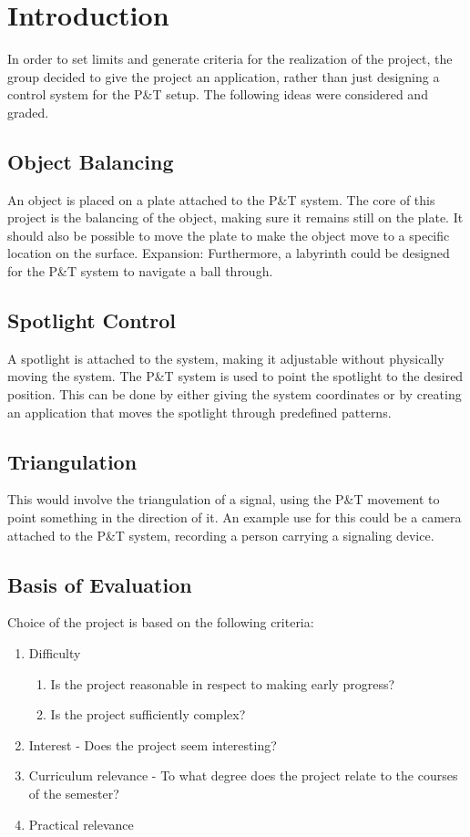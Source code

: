 \section{Introduction}

In order to set limits and generate criteria for the realization of the project, the group decided to give the project an application, rather than just designing a control system for the P\&T setup. The following ideas were considered and graded.

\subsection{Object Balancing}
An object is placed on a plate attached to the P\&T system. The core of this project is the balancing of the object, making sure it remains still on the plate. It should also be possible to move the plate to make the object move to a specific location on the surface.
Expansion: Furthermore, a labyrinth could be designed for the P\&T system to navigate a ball through.

\subsection{Spotlight Control}
A spotlight is attached to the system, making it adjustable without physically moving the system. The P\&T system is used to point the spotlight to the desired position. This can be done by either giving the system coordinates or by creating an application that moves the spotlight through predefined patterns.

\subsection{Triangulation}
This would involve the triangulation of a signal, using the P\&T movement to point something in the direction of it. An example use for this could be a camera attached to the P\&T system, recording a person carrying a signaling device.

\subsection{Basis of Evaluation}
Choice of the project is based on the following criteria:

\begin{enumerate}
\item Difficulty
\begin{enumerate}
\item Is the project reasonable in respect to making early progress?
\item Is the project sufficiently complex?
\end{enumerate}
\item Interest - Does the project seem interesting? 
\item Curriculum relevance - To what degree does the project relate to the courses of the semester?
\item Practical relevance
\end{enumerate}

